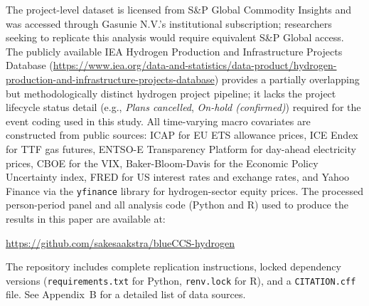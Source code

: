 \documentclass[11pt,a4paper]{article}
\begin{document}
The project-level dataset is licensed from S\&P Global Commodity Insights and was accessed through Gasunie N.V.'s institutional subscription; researchers seeking to replicate this analysis would require equivalent S\&P Global access. The publicly available IEA Hydrogen Production and Infrastructure Projects Database (\url{https://www.iea.org/data-and-statistics/data-product/hydrogen-production-and-infrastructure-projects-database}) provides a partially overlapping but methodologically distinct hydrogen project pipeline; it lacks the project lifecycle status detail (e.g., \textit{Plans cancelled}, \textit{On-hold (confirmed)}) required for the event coding used in this study. All time-varying macro covariates are constructed from public sources: ICAP for EU ETS allowance prices, ICE Endex for TTF gas futures, ENTSO-E Transparency Platform for day-ahead electricity prices, CBOE for the VIX, Baker-Bloom-Davis for the Economic Policy Uncertainty index, FRED for US interest rates and exchange rates, and Yahoo Finance via the \texttt{yfinance} library for hydrogen-sector equity prices. The processed person-period panel and all analysis code (Python and R) used to produce the results in this paper are available at:

\begin{center}
\url{https://github.com/sakesaakstra/blueCCS-hydrogen}
\end{center}

The repository includes complete replication instructions, locked dependency versions (\texttt{requirements.txt} for Python, \texttt{renv.lock} for R), and a \texttt{CITATION.cff} file. See Appendix~B for a detailed list of data sources.
\end{document}
